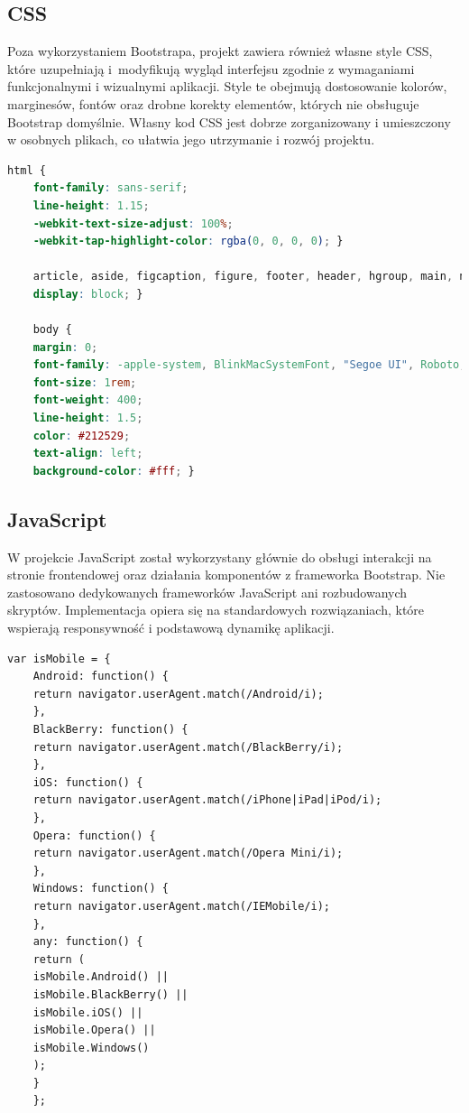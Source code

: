 \documentclass[12pt]{article}
\begin{document}
	\subsection{CSS}
	Poza wykorzystaniem Bootstrapa, projekt zawiera również własne style CSS, które uzupełniają i~modyfikują wygląd interfejsu zgodnie z wymaganiami funkcjonalnymi i wizualnymi aplikacji. Style te obejmują dostosowanie kolorów, marginesów, fontów oraz drobne korekty elementów, których nie obsługuje Bootstrap domyślnie. Własny kod CSS jest dobrze zorganizowany i umieszczony w osobnych plikach, co ułatwia jego utrzymanie i rozwój projektu.
	\begin{lstlisting}[language=CSS, caption={Fragment kodu CSS}]
	html {
	font-family: sans-serif;
	line-height: 1.15;
	-webkit-text-size-adjust: 100%;
	-webkit-tap-highlight-color: rgba(0, 0, 0, 0); }
	
	article, aside, figcaption, figure, footer, header, hgroup, main, nav, section {
	display: block; }
	
	body {
	margin: 0;
	font-family: -apple-system, BlinkMacSystemFont, "Segoe UI", Roboto, "Helvetica Neue", Arial, "Noto Sans", sans-serif, "Apple Color Emoji", "Segoe UI Emoji", "Segoe UI Symbol", "Noto Color Emoji";
	font-size: 1rem;
	font-weight: 400;
	line-height: 1.5;
	color: #212529;
	text-align: left;
	background-color: #fff; }
	\end{lstlisting}
	
	\subsection{JavaScript}
	W projekcie JavaScript został wykorzystany głównie do obsługi interakcji na stronie frontendowej oraz działania komponentów z frameworka Bootstrap. Nie zastosowano dedykowanych frameworków JavaScript ani rozbudowanych skryptów. Implementacja opiera się na standardowych rozwiązaniach, które wspierają responsywność i podstawową dynamikę aplikacji.
	\begin{lstlisting}[style=jsStyle, caption={Fragment kodu JavaScript}]
	var isMobile = {
	Android: function() {
	return navigator.userAgent.match(/Android/i);
	},
	BlackBerry: function() {
	return navigator.userAgent.match(/BlackBerry/i);
	},
	iOS: function() {
	return navigator.userAgent.match(/iPhone|iPad|iPod/i);
	},
	Opera: function() {
	return navigator.userAgent.match(/Opera Mini/i);
	},
	Windows: function() {
	return navigator.userAgent.match(/IEMobile/i);
	},
	any: function() {
	return (
	isMobile.Android() ||
	isMobile.BlackBerry() ||
	isMobile.iOS() ||
	isMobile.Opera() ||
	isMobile.Windows()
	);
	}
	};
	\end{lstlisting}
	
\end{document}
